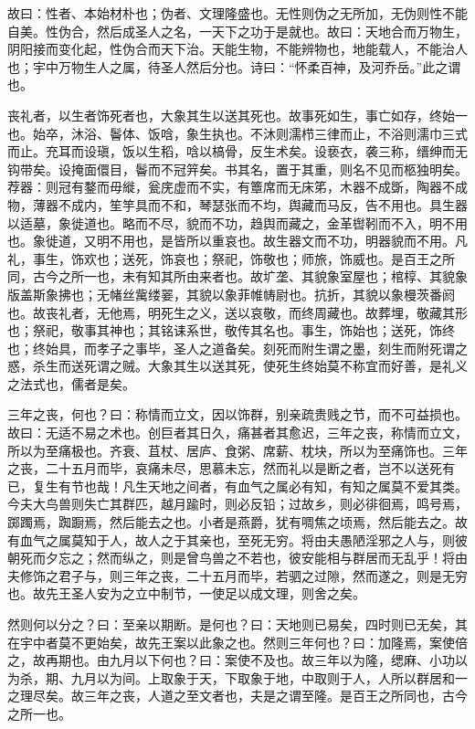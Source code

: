 \documentclass[]{article}
\begin{document}
故曰：性者、本始材朴也；伪者、文理隆盛也。无性则伪之无所加，无伪则性不能自美。性伪合，然后成圣人之名，一天下之功于是就也。故曰：天地合而万物生，阴阳接而变化起，性伪合而天下治。天能生物，不能辨物也，地能载人，不能治人也；宇中万物生人之属，待圣人然后分也。诗曰：``怀柔百神，及河乔岳。''此之谓也。

丧礼者，以生者饰死者也，大象其生以送其死也。故事死如生，事亡如存，终始一也。始卒，沐浴、鬠体、饭唅，象生执也。不沐则濡栉三律而止，不浴则濡巾三式而止。充耳而设瑱，饭以生稻，唅以槁骨，反生术矣。设亵衣，袭三称，缙绅而无钩带矣。设掩面儇目，鬠而不冠笄矣。书其名，置于其重，则名不见而柩独明矣。荐器：则冠有鍪而毋縰，瓮庑虚而不实，有簟席而无床笫，木器不成斲，陶器不成物，薄器不成内，笙竽具而不和，琴瑟张而不均，舆藏而马反，告不用也。具生器以适墓，象徙道也。略而不尽，貌而不功，趋舆而藏之，金革辔靷而不入，明不用也。象徙道，又明不用也，是皆所以重哀也。故生器文而不功，明器貌而不用。凡礼，事生，饰欢也；送死，饰哀也；祭祀，饰敬也；师旅，饰威也。是百王之所同，古今之所一也，未有知其所由来者也。故圹垄、其貌象室屋也；棺椁、其貌象版盖斯象拂也；无帾丝歶缕翣，其貌以象菲帷帱尉也。抗折，其貌以象槾茨番阏也。故丧礼者，无他焉，明死生之义，送以哀敬，而终周藏也。故葬埋，敬藏其形也；祭祀，敬事其神也；其铭诔系世，敬传其名也。事生，饰始也；送死，饰终也；终始具，而孝子之事毕，圣人之道备矣。刻死而附生谓之墨，刻生而附死谓之惑，杀生而送死谓之贼。大象其生以送其死，使死生终始莫不称宜而好善，是礼义之法式也，儒者是矣。

三年之丧，何也？曰：称情而立文，因以饰群，别亲疏贵贱之节，而不可益损也。故曰：无适不易之术也。创巨者其日久，痛甚者其愈迟，三年之丧，称情而立文，所以为至痛极也。齐衰、苴杖、居庐、食粥、席薪、枕块，所以为至痛饰也。三年之丧，二十五月而毕，哀痛未尽，思慕未忘，然而礼以是断之者，岂不以送死有已，复生有节也哉！凡生天地之间者，有血气之属必有知，有知之属莫不爱其类。今夫大鸟兽则失亡其群匹，越月踰时，则必反铅；过故乡，则必徘徊焉，鸣号焉，踯躅焉，踟蹰焉，然后能去之也。小者是燕爵，犹有啁焦之顷焉，然后能去之。故有血气之属莫知于人，故人之于其亲也，至死无穷。将由夫愚陋淫邪之人与，则彼朝死而夕忘之；然而纵之，则是曾鸟兽之不若也，彼安能相与群居而无乱乎！将由夫修饰之君子与，则三年之丧，二十五月而毕，若驷之过隙，然而遂之，则是无穷也。故先王圣人安为之立中制节，一使足以成文理，则舍之矣。

然则何以分之？曰：至亲以期断。是何也？曰：天地则已易矣，四时则已无矣，其在宇中者莫不更始矣，故先王案以此象之也。然则三年何也？曰：加隆焉，案使倍之，故再期也。由九月以下何也？曰：案使不及也。故三年以为隆，缌麻、小功以为杀，期、九月以为间。上取象于天，下取象于地，中取则于人，人所以群居和一之理尽矣。故三年之丧，人道之至文者也，夫是之谓至隆。是百王之所同也，古今之所一也。
\end{document}
